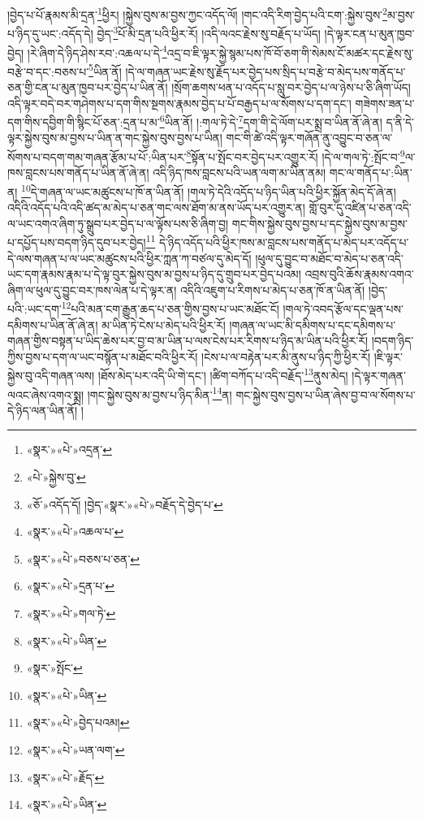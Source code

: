 །བྱེད་པ་པོ་རྣམས་མི་དྲན་\footnote{«སྣར་»«པེ་»འདྲན་}ཕྱིར། །སྐྱེས་བུས་མ་བྱས་ཀྱང་འདོད་ལོ། །གང་འདི་རིག་བྱེད་པའི་ངག་:སྐྱེས་བུས་\footnote{«པེ་»སྐྱེས་བུ་}མ་བྱས་པ་ཉིད་དུ་ཡང་:འདོད་དེ། བྱེད་\footnote{«ཅོ་»འདོད་དོ། །བྱེད་«སྣར་»«པེ་»བརྗོད་དེ་བྱེད་པ་}པོ་མི་དྲན་པའི་ཕྱིར་རོ། །འདི་ལའང་རྗེས་སུ་བརྗོད་པ་ཡོད། །དེ་ལྟར་ངན་པ་མུན་ཁྱབ་བྱེད། །རེ་ཞིག་དེ་ཉིད་ཤེས་རབ་:འཆལ་པ་དེ་\footnote{«སྣར་»«པེ་»འཆལ་པ་}འདྲ་བ་ཇི་ལྟར་སྐྱེ་སྙམ་པས་ཁོ་བོ་ཅག་གི་སེམས་ངོ་མཚར་དང་རྗེས་སུ་བརྩེ་བ་དང་:བཅས་པ་\footnote{«སྣར་»«པེ་»བཅས་པ་ཅན་}ཡིན་ནོ། །དེ་ལ་གཞན་ཡང་རྗེས་སུ་རྗོད་པར་བྱེད་པས་སྲིད་པ་བརྩེ་བ་མེད་པས་གནོད་པ་ཅན་གྱི་ངན་པ་མུན་ཁྱབ་པར་བྱེད་པ་ཡིན་ནོ། །སྲོག་ཆགས་ཕན་པ་འདོད་པ་སླུ་བར་བྱེད་པ་ལ་ཉེས་པ་ཅི་ཞིག་ཡོད། འདི་ལྟར་བདེ་བར་གཤེགས་པ་དག་གིས་སྔགས་རྣམས་བྱེད་པ་པོ་བརྒྱད་པ་ལ་སོགས་པ་དག་དང་། གཟེགས་ཟན་པ་དག་གིས་དབྱིག་གི་སྙིང་པོ་ཅན་:དྲན་པ་མ་\footnote{«སྣར་»«པེ་»དྲན་པ་}ཡིན་ནོ། །:གལ་ཏེ་དེ་\footnote{«སྣར་»«པེ་»གལ་ཏེ་}དག་གི་དེ་ལོག་པར་སྨྲ་བ་ཡིན་ནོ་ཞེ་ན། ད་ནི་དེ་ལྟར་སྐྱེས་བུས་མ་བྱས་པ་ཡིན་ན་གང་སྐྱེས་བུས་བྱས་པ་ཡིན། གང་གི་ཚེ་འདི་ལྟར་གཞོན་ནུ་འབྱུང་བ་ཅན་ལ་སོགས་པ་བདག་གམ་གཞན་རྩོམ་པ་པོ་:ཡིན་པར་\footnote{«སྣར་»«པེ་»ཡིན་}སྟོན་པ་སྤོང་བར་བྱེད་པར་འགྱུར་རོ། །དེ་ལ་གལ་ཏེ་:སྤོང་བ་\footnote{«སྣར་»སྤོང་}ལ་ཁས་བླངས་པས་གནོད་པ་ཡིན་ནོ་ཞེ་ན། འདི་ཉིད་ཁས་བླངས་པའི་ཡན་ལག་མ་ཡིན་ནམ། གང་ལ་གནོད་པ་:ཡིན་ན། \footnote{«སྣར་»«པེ་»ཡིན་}དེ་གཞན་ལ་ཡང་མཚུངས་པ་ཁོ་ན་ཡིན་ནོ། །གལ་ཏེ་དེའི་འདོད་པ་ཉིད་ཡིན་པའི་ཕྱིར་སྐྱོན་མེད་དོ་ཞེ་ན། འདིའི་འདོད་པའི་འདི་ཚད་མ་མེད་པ་ཅན་གང་ལས་ཐོག་མ་ནས་ཡོད་པར་འགྱུར་ན། གློ་བུར་དུ་འཛིན་པ་ཅན་འདི་ལ་ཡང་འགའ་ཞིག་ཏུ་སྒྲུབ་པར་བྱེད་པ་ལ་ལྟོས་པས་ཅི་ཞིག་བྱ། གང་གིས་སྐྱེས་བུས་བྱས་པ་དང་སྐྱེས་བུས་མ་བྱས་པ་དཔྱོད་པས་བདག་ཉིད་དུབ་པར་བྱེད།\footnote{«སྣར་»«པེ་»བྱེད་པའམ།} དེ་ཉིད་འདོད་པའི་ཕྱིར་ཁས་མ་བླངས་པས་གནོད་པ་མེད་པར་འདོད་པ་དེ་ལས་གཞན་པ་ལ་ཡང་མཚུངས་པའི་ཕྱིར་ཀླན་ཀ་བཙལ་དུ་མེད་དོ། །ཕུལ་དུ་བྱུང་བ་མཐོང་བ་མེད་པ་ཅན་འདི་ཡང་དག་རྣམས་རྣམ་པ་དེ་ལྟ་བུར་སྐྱེས་བུས་མ་བྱས་པ་ཉིད་དུ་གྲུབ་པར་བྱེད་པའམ། འབྲས་བུའི་ཆོས་རྣམས་འགའ་ཞིག་ལ་ཕུལ་དུ་བྱུང་བར་ཁས་ལེན་པ་དེ་ལྟར་ན། འདིའི་འཇུག་པ་རིགས་པ་མེད་པ་ཅན་ཁོ་ན་ཡིན་ནོ། །བྱེད་པའི་:ཡང་དག་\footnote{«སྣར་»«པེ་»ཡན་ལག་}པའི་མན་ངག་རྒྱུན་ཆད་པ་ཅན་གྱིས་བྱས་པ་ཡང་མཐོང་ངོ། །གལ་ཏེ་འབད་རྩོལ་དང་ལྡན་པས་དམིགས་པ་ཡིན་ནོ་ཞེ་ན། མ་ཡིན་ཏེ་ངེས་པ་མེད་པའི་ཕྱིར་རོ། །གཞན་ལ་ཡང་མི་དམིགས་པ་དང་དམིགས་པ་གཞན་གྱིས་བསྟན་པ་ཡིད་ཆེས་པར་བྱ་བ་མ་ཡིན་པ་ལས་ངེས་པར་རིགས་པ་ཉིད་མ་ཡིན་པའི་ཕྱིར་རོ། །བདག་ཉིད་ཀྱིས་བྱས་པ་དག་ལ་ཡང་བསྙོན་པ་མཐོང་བའི་ཕྱིར་རོ། །ངེས་པ་ལ་བརྟེན་པར་མི་ནུས་པ་ཉིད་ཀྱི་ཕྱིར་རོ། །ཇི་ལྟར་སྐྱེས་བུ་འདི་གཞན་ལས། །ཐོས་མེད་པར་འདི་ཡི་གེ་དང་། །ཚིག་བཀོད་པ་འདི་བརྗོད་\footnote{«སྣར་»«པེ་»རྗོད་}ནུས་མེད། །དེ་ལྟར་གཞན་ལའང་ཞེས་འགའ་སྨྲ། །གང་སྐྱེས་བུས་མ་བྱས་པ་ཉིད་མིན་\footnote{«སྣར་»«པེ་»ཡིན་}ན། གང་སྐྱེས་བུས་བྱས་པ་ཡིན་ཞེས་བྱ་བ་ལ་སོགས་པ་དེ་ཉིད་ལན་ཡིན་ནོ། །
